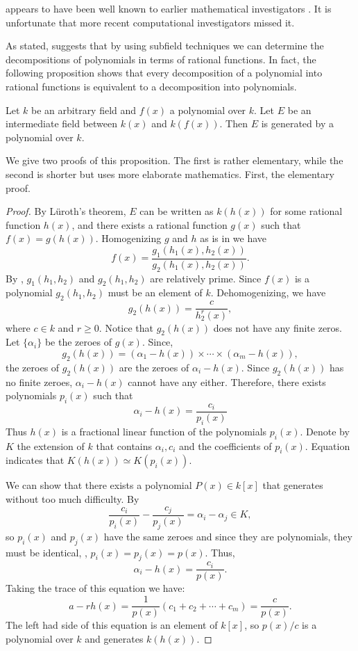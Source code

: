  appears to have been well known to
earlier mathematical investigators \cite{Dorey1974-vp,Fried1974-gb}.  It is
unfortunate that more recent computational investigators missed it.

As stated,  suggests that by using
subfield techniques we can determine the decompositions of polynomials
in terms of rational functions.  In fact, the following proposition
shows that every decomposition of a polynomial into rational functions
is equivalent to a decomposition into polynomials. 

\begin{proposition}
\label{Poly:Decomp:Corres:Prop}
Let $k$ be an arbitrary field and $f(x)$ a polynomial over $k$.  Let
$E$ be an intermediate field between $k(x)$ and $k(f(x))$.  Then $E$
is generated by a polynomial over $k$.
\end{proposition}

We give two proofs of this proposition.  The first is rather
elementary, while the second is shorter but uses more elaborate
mathematics.  First, the elementary proof.

\begin{proof}
By L\"uroth's theorem, $E$ can be written as $k(h(x))$ for some
rational function $h(x)$, and there exists a rational function $g(x)$
such that $f(x) = g(h(x))$.  Homogenizing $g$ and $h$ as is in
 we have
\[
f(x) = \frac{g_1(h_1(x), h_2(x))}{g_2(h_1(x), h_2(x))}.
\]
By , $g_1(h_1, h_2)$ and $g_2(h_1, h_2)$ are
relatively prime.  Since $f(x)$ is a polynomial $g_2(h_1, h_2)$ must
be an element of $k$.  Dehomogenizing, we have
\[
g_2(h(x)) = \frac{c}{h_2^r(x)},
\]
where $c \in k$ and $r \ge 0$.  Notice that $g_2(h(x))$ does not have
any finite zeros.  Let $\{\alpha_i\}$ be the zeroes of $g(x)$.  Since,
\[
g_2(h(x)) = (\alpha_1 - h(x)) \times \cdots \times (\alpha_m - h(x)),
\]
the zeroes of $g_2(h(x))$ are the zeroes of $\alpha_i - h(x)$.  Since
$g_2(h(x))$ has no finite zeroes, $\alpha_i - h(x)$ cannot have any
either.  Therefore, there exists polynomials $p_i(x)$ such that
\begin{equation}
\label{Poly:Corres:Eq}
\alpha_i - h(x) = \frac{c_i}{p_i(x)}
\end{equation}
Thus $h(x)$ is a fractional linear function of the polynomials
$p_i(x)$.  Denote by $K$ the extension of $k$ that contains $\alpha_i,
c_i$ and the coefficients of $p_i(x)$.  Equation
 indicates that $K(h(x)) \simeq K(p_i(x))$.  

We can show that there exists a polynomial $P(x) \in k[x]$ that
generates without too much difficulty.  By 
\[
\frac{c_i}{p_i(x)}  - \frac{c_j}{p_j(x)} = \alpha_i - \alpha_j \in K,
\]
so $p_i(x)$ and $p_j(x)$ have the same zeroes and since they are
polynomials, they must be identical, \ie, $p_i(x) = p_j(x) = p(x)$.
Thus,
\[
\alpha_i - h(x) = \frac{c_i}{p(x)}.
\]
Taking the trace of this equation we have: 
\[
a - r h(x) = \frac{1}{p(x)} \left( c_1 +c_2 + \cdots + c_m\right) 
  = \frac{c}{p(x)}.
\]
The left had side of this equation is an element of $k[x]$, so
$p(x)/c$ is a polynomial over $k$ and generates $k(h(x))$.
\end{proof}

